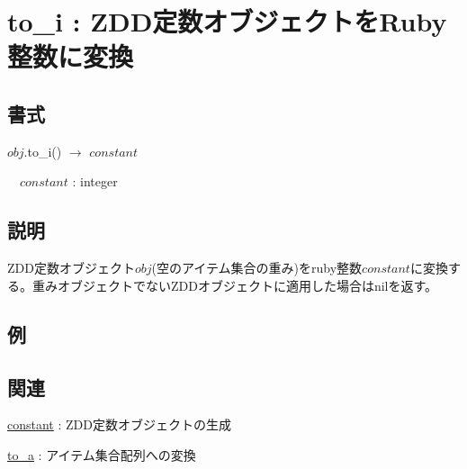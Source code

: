 
\section{to\_i : ZDD定数オブジェクトをRuby整数に変換\label{sect:to_i}}
\subsection*{書式}
$obj$.to\_i() $\rightarrow$ $constant$

~~$constant$ : integer

\subsection*{説明}
ZDD定数オブジェクト$obj$(空のアイテム集合の重み)をruby整数$constant$に変換する。重みオブジェクトでないZDDオブジェクトに適用した場合はnilを返す。


\subsection*{例}


\subsection*{関連}
\hyperref[sect:constant]{constant} : ZDD定数オブジェクトの生成

\hyperref[sect:to_a]{to\_a} : アイテム集合配列への変換

